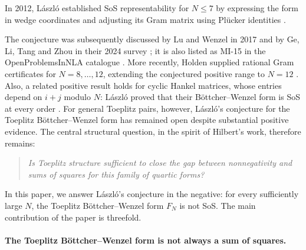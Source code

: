 In 2012, L\'aszl\'o established SoS representability for $N\le7$
by expressing the form in wedge coordinates and adjusting its Gram
matrix using Pl\"ucker identities \cite[Section~5]{laszlo2012}.

The conjecture was subsequently discussed by Lu and Wenzel in 2017
\cite{lu2017} and by Ge, Li, Tang and Zhou in their 2024 survey
\cite{ge2024published}; it is also listed as MI-15 in the
OpenProblemsInNLA catalogue \cite{catalogue2026}.
More recently, Holden supplied rational Gram certificates for
$N=8,\ldots,12$, extending the conjectured positive range to $N=12$ \cite{holden2026}.
Also, a related positive result holds for cyclic Hankel matrices, whose
entries depend on $i+j$ modulo $N$: L\'aszl\'o proved that their
B\"ottcher--Wenzel form is SoS at every order
\cite[Theorem~7]{laszlo2012}.
For general Toeplitz pairs, however,  L\'aszl\'o's conjecture for the Toeplitz B\"ottcher--Wenzel form
 has remained open despite substantial positive evidence.
The central structural question, in the spirit of Hilbert's work,
therefore remains:
\begin{quote}
\emph{Is Toeplitz structure sufficient to close the gap between
nonnegativity and sums of squares for this family of quartic forms?}
\end{quote}

In this paper, we answer L\'aszl\'o's conjecture in the negative:
{for every sufficiently large $N$, the Toeplitz
B\"ottcher--Wenzel form $F_N$ is not SoS. }The main contribution of the
paper is threefold.

\paragraph{The Toeplitz B\"ottcher--Wenzel form is not always a sum of squares.}

